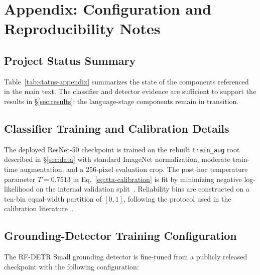 \appendix

\section{Appendix: Configuration and Reproducibility Notes}

\subsection{Project Status Summary}

Table~\ref{tab:status-appendix} summarizes the state of the components
referenced in the main text. The classifier and detector evidence are
sufficient to support the results in \S\ref{sec:results}; the
language-stage components remain in transition.

\begin{table}[H]
\centering
\caption{Status summary for the components referenced in this
manuscript.}
\label{tab:status-appendix}

\end{table}

\subsection{Classifier Training and Calibration Details}

The deployed ResNet-50 checkpoint is trained on the rebuilt
\texttt{train\_aug} root described in \S\ref{sec:data} with standard
ImageNet normalization, moderate train-time augmentation, and a
256-pixel evaluation crop. The post-hoc temperature parameter
$T = 0.7513$ in Eq.~\ref{eq:tta-calibration} is fit by minimizing
negative log-likelihood on the internal validation
split~\citep{guo2017calibration}. Reliability bins are constructed on a
ten-bin equal-width partition of $[0,1]$, following the protocol used
in the calibration literature~\citep{naeini2015ece}.

\subsection{Grounding-Detector Training Configuration}

The RF-DETR Small grounding detector is fine-tuned from a publicly
released checkpoint with the following configuration:

